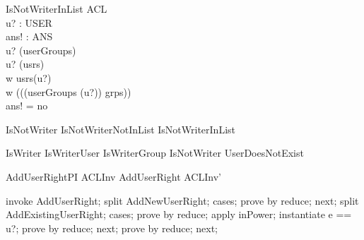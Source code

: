 \begin{schema}{IsNotWriterInList} 
\Xi ACL \\
u? : USER \\
ans! : ANS \\
\where 
u? \in \dom (userGroups) \\ 
u? \in \dom (usrs) \\
w \notin usrs(u?) \\
w \notin \bigcup (\ran((userGroups (u?)) \dres grps)) \\
ans! = no
\end{schema}

\begin{zed}
IsNotWriter  IsNotWriterNotInList \lor IsNotWriterInList\\
\end{zed}
\begin{zed}
IsWriter  IsWriterUser \lor IsWriterGroup \lor IsNotWriter \lor UserDoesNotExist
\end{zed}

\begin{theorem}{AddUserRightPI}
ACLInv \land AddUserRight \implies ACLInv'
\end{theorem}

\begin{zproof}[AddUserRightPI]
invoke AddUserRight;
split AddNewUserRight;
cases;
prove by reduce;
next;
split AddExistingUserRight;
cases;
prove by reduce;
apply inPower;
instantiate e == u?;
prove by reduce;
next;
prove by reduce;
next;
\end{zproof}





